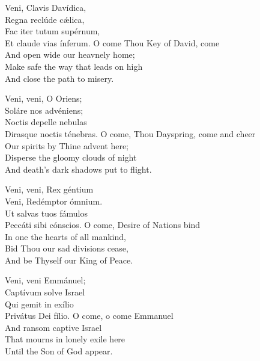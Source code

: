 Veni, Clavis Davídica,\\
Regna reclúde cǽlica,\\
Fac iter tutum supérnum,\\
Et claude vias ínferum.
\divverse
O come Thou Key of David, come\\
And open wide our heavnely home;\\
Make safe the way that leads on high\\
And close the path to misery.
\finishverse


Veni, veni, O Oriens;\\
Soláre nos advéniens;\\
Noctis depelle nebulas\\
Dirasque noctis ténebras.
\divverse
O come, Thou Dayspring, come and cheer\\
Our spirits by Thine advent here;\\
Disperse the gloomy clouds of night\\
And death’s dark shadows put to flight.
\finishverse

Veni, veni, Rex géntium\\
Veni, Redémptor ómnium.\\
Ut salvas tuos fámulos\\
Peccáti sibi cónscios.
\divverse
O come, Desire of Nations bind\\
In one the hearts of all mankind,\\
Bid Thou our sad divisions cease,\\
And be Thyself our King of Peace.
\finishverse

Veni, veni Emmánuel;\\
Captívum solve Israel\\
Qui gemit in exílio\\
Privátus Dei fílio.
\divverse
O come, o come Emmanuel\\
And ransom captive Israel\\
That mourns in lonely exile here\\
Until the Son of God appear.
\finishverse

\bigskip


\setlength{\englishwidth}{0.5\textwidth}
\setlength{\latinwidth}{0.48\textwidth}

